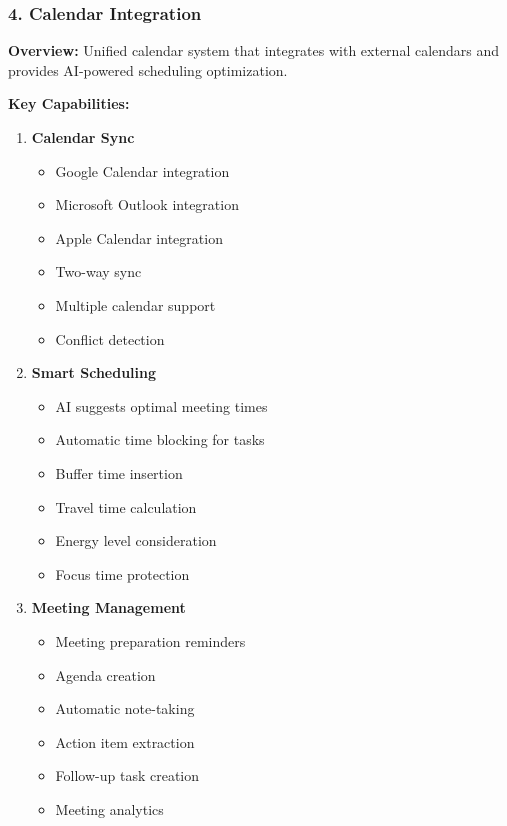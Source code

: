 \subsubsection{4. Calendar Integration}

\textbf{Overview:}
Unified calendar system that integrates with external calendars and provides AI-powered scheduling optimization.

\textbf{Key Capabilities:}

\begin{enumerate}
    \item \textbf{Calendar Sync}
    \begin{itemize}
        \item Google Calendar integration
        \item Microsoft Outlook integration
        \item Apple Calendar integration
        \item Two-way sync
        \item Multiple calendar support
        \item Conflict detection
    \end{itemize}
    
    \item \textbf{Smart Scheduling}
    \begin{itemize}
        \item AI suggests optimal meeting times
        \item Automatic time blocking for tasks
        \item Buffer time insertion
        \item Travel time calculation
        \item Energy level consideration
        \item Focus time protection
    \end{itemize}
    
    \item \textbf{Meeting Management}
    \begin{itemize}
        \item Meeting preparation reminders
        \item Agenda creation
        \item Automatic note-taking
        \item Action item extraction
        \item Follow-up task creation
        \item Meeting analytics
    \end{itemize}
    

\end{enumerate}
